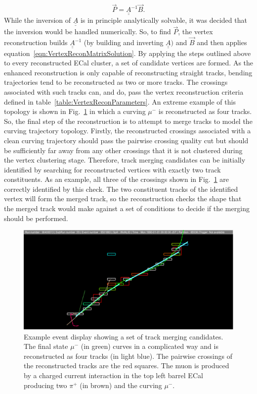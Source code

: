 \begin{equation}
  \vec{P} = \underline{\underline{A}}^{-1} \vec{B}.
  \label{eqn:VertexReconMatrixSolution}
\end{equation}
While the inversion of $\underline{\underline{A}}$ is in principle analytically solvable, it was decided that the inversion would be handled numerically.  So, to find $\vec{P}$, the vertex reconstruction builds $\underline{\underline{A}}^{-1}$ (by building and inverting $\underline{\underline{A}})$ and $\vec{B}$ and then applies equation~\ref{eqn:VertexReconMatrixSolution}.
\newline
\newline
By applying the steps outlined above to every reconstructed ECal cluster, a set of candidate vertices are formed.  As the enhanced reconstruction is only capable of reconstructing straight tracks, bending trajectories tend to be reconstructed as two or more tracks.  The crossings associated with such tracks can, and do, pass the vertex reconstruction criteria defined in table~\ref{table:VertexReconParameters}.  An extreme example of this topology is shown in Fig.~\ref{fig:TrackMergingEventDisplay} in which a curving $\mu^-$ is reconstructed as four tracks.  So, the final step of the reconstruction is to attempt to merge tracks to model the curving trajectory topology.  Firstly, the reconstructed crossings associated with a clean curving trajectory should pass the pairwise crossing quality cut but should be sufficiently far away from any other crossings that it is not clustered during the vertex clustering stage.  Therefore, track merging candidates can be initially identified by searching for reconstructed vertices with exactly two track constituents.  As an example, all three of the crossings shown in Fig.~\ref{fig:TrackMergingEventDisplay} are correctly identified by this check.  The two constituent tracks of the identified vertex will form the merged track, so the reconstruction checks the shape that the merged track would make against a set of conditions to decide if the merging should be performed. 
\begin{figure}
  \centering
  \includegraphics[width=12cm]{images/selection/vertex_recon/track_merging_event_display.eps}
  \caption{Example event display showing a set of track merging candidates.  The final state $\mu^-$ (in green) curves in a complicated way and is reconstructed as four tracks (in light blue).  The pairwise crossings of the reconstructed tracks are the red squares.  The muon is produced by a charged current interaction in the top left barrel ECal producing two $\pi^+$ (in brown) and the curving $\mu^-$. }
  \label{fig:TrackMergingEventDisplay}
\end{figure}
